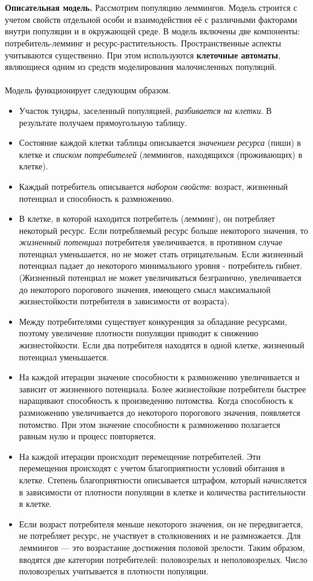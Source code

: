 \documentclass[a4paper, 12pt]{report}
\numberwithin{equation}{section}
\begin{document}
\\\\
\textbf{Описательная модель.} Рассмотрим популяцию леммингов.
Модель строится с учетом свойств отдельной особи и взаимодействия её с различными факторами внутри популяции и в окружающей среде. В модель включены две компоненты: потребитель-лемминг и ресурс-растительность.  Пространственные аспекты учитываются существенно. При этом используются \textbf{клеточные автоматы}, являющиеся одним из средств моделирования малочисленных популяций.
\\\\
Модель функционирует следующим образом.
\begin{itemize}
    \item Участок тундры, заселенный популяцией, \textit{разбивается на клетки}. В результате получаем прямоугольную таблицу.
    \item  Состояние каждой клетки таблицы описывается \textit{значением ресурса} (пиши) в клетке и \textit{списком потребителей} (леммингов, находящихся (проживающих) в клетке).
    \item  Каждый потребитель описывается \textit{набором свойств}: возраст, жизненный потенциал и способность к размножению.
    \item В клетке, в которой находится потребитель (лемминг), он потребляет некоторый ресурс. Если потребляемый ресурс больше некоторого значения, то \textit{жизненный потенциал} потребителя увеличивается, в противном случае потенциал уменьшается, но не может стать отрицательным. Если жизненный потенциал падает до некоторого минимального уровня - потребитель гибнет.
    (Жизненный потенциал не может увеличиваться безгранично, увеличивается до некоторого порогового значения, имеющего смысл максимальной жизнестойкости потребителя в зависимости от возраста).
    \item Между потребителями существует конкуренция за обладание ресурсами, поэтому увеличение плотности популяции приводит к снижению жизнестойкости. Если два потребителя находятся в одной клетке, жизненный потенциал уменьшается.
    \item На каждой итерации значение способности к размножению увеличивается и зависит от жизненного потенциала. Более жизнестойкие потребители быстрее наращивают способность к произведению потомства. Когда способность к размножению увеличивается до некоторого порогового значения, появляется потомство. При этом значение способности к размножению полагается равным нулю и процесс повторяется.
    \item На каждой итерации происходит перемещение потребителей. Эти перемещения происходят с учетом благоприятности условий обитания в клетке. Степень благоприятности описывается штрафом, который начисляется в зависимости от плотности популяции в клетке и количества растительности в клетке.
    \item Если возраст потребителя меньше некоторого значения, он не передвигается, не потребляет ресурс, не участвует в столкновениях и не размножается. 
Для леммингов — это возрастание достижения половой зрелости.
Таким образом, вводятся две категории потребителей: половозрелых и неполовозрелых. Число половозрелых учитывается в плотности популяции.
\end{itemize}
\end{document}
